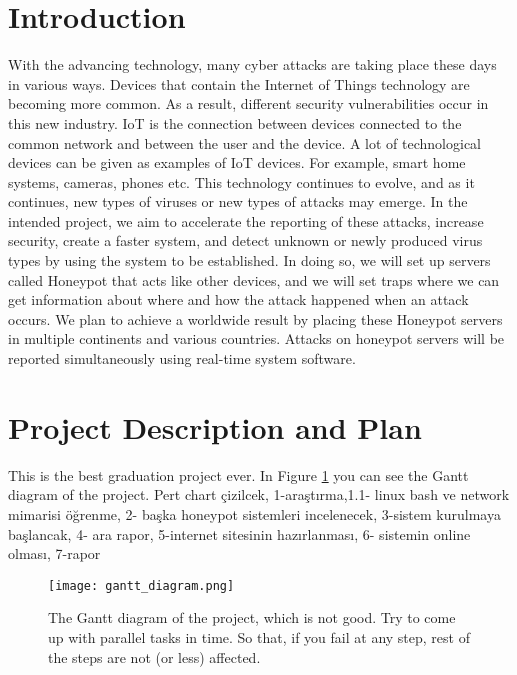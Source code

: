 \documentclass[a4paper, 12pt]{article}
\begin{document}
\section{Introduction}
With the advancing technology, many cyber attacks are taking place these days in various ways. Devices that contain the Internet of Things technology are becoming more common. As a result, different security vulnerabilities occur in this new industry. IoT is the connection between devices connected to the common network and between the user and the device. A lot of technological devices can be given as examples of IoT devices. For example, smart home systems, cameras, phones etc. This technology continues to evolve, and as it continues, new types of viruses or new types of attacks may emerge. In the intended project, we aim to accelerate the reporting of these attacks, increase security, create a faster system, and detect unknown or newly produced virus types by using the system to be established. In doing so, we will set up servers called Honeypot that acts like other devices, and we will set traps where we can get information about where and how the attack happened when an attack occurs. We plan to achieve a worldwide result by placing these Honeypot servers in multiple continents and various countries. Attacks on honeypot servers will be reported simultaneously using real-time system software.

\newpage
\section{Project Description and Plan}
This is the best graduation project ever. In Figure \ref{fig:ganttdiagram} you can see the Gantt diagram of the project.
Pert chart çizilcek, 1-araştırma,1.1- linux bash ve network mimarisi öğrenme,  2- başka honeypot sistemleri incelenecek, 3-sistem kurulmaya başlancak, 4- ara rapor, 5-internet sitesinin hazırlanması, 6- sistemin online olması, 7-rapor

\begin{figure}[H]
    \centering
    \shorthandoff{=}
    \texttt{[image: gantt\_diagram.png]}
    \shorthandon{=}
    \caption{The Gantt diagram of the project, which is not good. Try to come up with parallel tasks in time. So that, if you fail at any step, rest of the steps are not (or less) affected.}
    \label{fig:ganttdiagram}
\end{figure}
\end{document}
